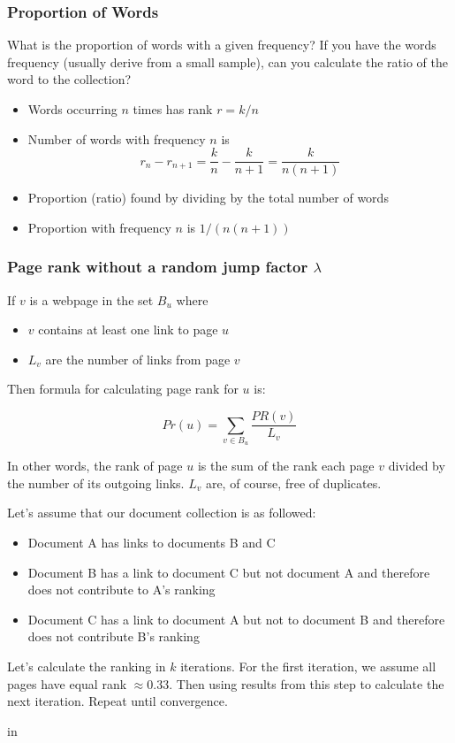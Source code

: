 \documentclass[handout,sanserif,mathserif]{beamer}
\begin{document}
\begin{frame}
\frametitle{Proportion of Words}

What is the proportion of words with a given frequency?  If you have the words frequency (usually derive from a small sample), can you calculate the ratio of the word to the collection?

\begin{itemize}

\item Words occurring $n$ times has rank $r = k/n$
\item Number of words with frequency $n$ is
$$ r_{n} - r_{n+1} = \frac{k}{n} - \frac{k}{n+1} = \frac{k}{n(n+1)} $$
\item Proportion (ratio) found by dividing by the total number of words
\item Proportion with frequency $n$ is $1/(n(n+1))$
\end{itemize}

\end{frame}


\begin{frame}
\frametitle{Page rank {\bf without} a random jump factor $\lambda$}

If $v$ is a webpage in the set $B_u$ where 

\begin{itemize}
\item $v$ contains at least one link to page $u$
\item $L_v$ are the number of links from page $v$
\end{itemize}

Then formula for calculating page rank for $u$  is:

$$ 
  Pr(u) = \sum_{v\in B_u} { \frac{PR(v)}{L_v} }
$$

In other words, the rank of page $u$ is the sum of the rank each page $v$ divided by the number of its outgoing links.  $L_v$ are, of course, free of duplicates.

\end{frame}

\begin{frame}

Let's assume that our document collection is as followed:

\begin{itemize}

\item Document A has links to documents B and C
\item Document B has a link to document C but not document A and therefore does not contribute to A's ranking
\item Document C has a link to document A but not to document B and therefore does not contribute B's ranking

\end{itemize}

Let's calculate the ranking in $k$ iterations.  For the first iteration, we assume all pages have equal rank $\approx 0.33$.  Then using results from this step to calculate the next iteration.  Repeat until convergence.

 in

\end{frame}
\end{document}
